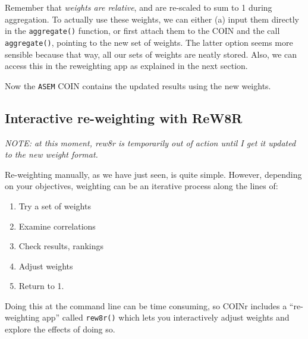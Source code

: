 \documentclass[
]{book}
\newenvironment{Shaded}{\begin{snugshade}}{\end{snugshade}}
\newcommand{\CommentTok}[1]{\textcolor[rgb]{0.56,0.35,0.01}{\textit{#1}}}
\newcommand{\DataTypeTok}[1]{\textcolor[rgb]{0.13,0.29,0.53}{#1}}
\newcommand{\KeywordTok}[1]{\textcolor[rgb]{0.13,0.29,0.53}{\textbf{#1}}}
\newcommand{\NormalTok}[1]{#1}
\newcommand{\OperatorTok}[1]{\textcolor[rgb]{0.81,0.36,0.00}{\textbf{#1}}}
\newcommand{\StringTok}[1]{\textcolor[rgb]{0.31,0.60,0.02}{#1}}
\providecommand{\tightlist}{%
  \setlength{\itemsep}{0pt}\setlength{\parskip}{0pt}}
\begin{document}
Remember that \emph{weights are relative}, and are re-scaled to sum to 1 during aggregation. To actually use these weights, we can either (a) input them directly in the \texttt{aggregate()} function, or first attach them to the COIN and the call \texttt{aggregate()}, pointing to the new set of weights. The latter option seems more sensible because that way, all our sets of weights are neatly stored. Also, we can access this in the reweighting app as explained in the next section.

\begin{Shaded}
\end{Shaded}

Now the \texttt{ASEM} COIN contains the updated results using the new weights.

\hypertarget{interactive-re-weighting-with-rew8r}{%
\subsection{Interactive re-weighting with ReW8R}\label{interactive-re-weighting-with-rew8r}}

\emph{NOTE: at this moment, rew8r is temporarily out of action until I get it updated to the new weight format.}

Re-weighting manually, as we have just seen, is quite simple. However, depending on your objectives, weighting can be an iterative process along the lines of:

\begin{enumerate}
\def\labelenumi{\arabic{enumi}.}
\tightlist
\item
  Try a set of weights
\item
  Examine correlations
\item
  Check results, rankings
\item
  Adjust weights
\item
  Return to 1.
\end{enumerate}

Doing this at the command line can be time consuming, so COINr includes a ``re-weighting app'' called \texttt{rew8r()} which lets you interactively adjust weights and explore the effects of doing so.
\end{document}
